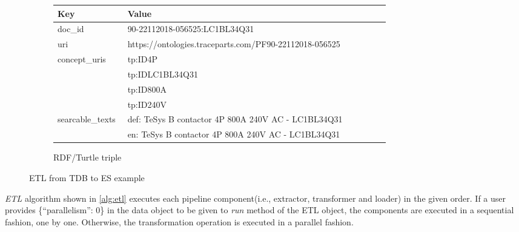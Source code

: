 \begin{figure}[H]
\ContinuedFloat

\begin{subfigure}{\textwidth}
  \centering

  \begin{table}[H]
	  \begin{tabular}{|p{0.20\linewidth}|p{0.75\linewidth}|}
		  \hline
		  \textbf{Key} & \textbf{Value} \\
		  \hline
		  doc\_id & 90-22112018-056525:LC1BL34Q31 \\
		  \hline
		  uri & https://ontologies.traceparts.com/PF90-22112018-056525 \\
		  \hline
		  \multirow{4}{*}{concept\_uris} & tp:ID4P \\
		   & tp:IDLC1BL34Q31 \\
		   & tp:ID800A \\
		   & tp:ID240V \\
		  \hline
		  \multirow{2}{*}{searcable\_texts} & def: TeSys B contactor 4P 800A 240V AC - LC1BL34Q31 \\ 
		   & en: TeSys B contactor 4P 800A 240V AC - LC1BL34Q31 \\
		  \hline
	  \end{tabular}
  \end{table}

  \caption{RDF/Turtle triple}
  \label{fig:ses_json_example}
\end{subfigure}
\caption{ETL from TDB to ES example}
\label{fig:etl-2_example}
\end{figure}

\textit{ETL} algorithm shown in \ref{alg:etl} executes each pipeline component(i.e., extractor, 
transformer and loader) in the given order. If a user provides \{``parallelism'': 0\} in the data 
object to be given to \textit{run} method of the ETL object, the components are executed in a 
sequential fashion, one by one. Otherwise, the transformation operation is executed in a parallel 
fashion.

